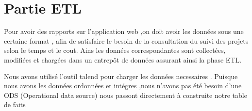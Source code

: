 \section{ Partie ETL }
Pour avoir des rapports sur l'application web ,on doit avoir les données sous une certaine format ,
afin de satisfaire le besoin de la consultation du suivi des projets selon le temps et le cout.
Ains les données correspondantes sont collectées, modifiées et chargées dans un entrepôt de données
assurant ainsi la phase ETL.

Nous avons utilisé l'outil talend pour charger les données necessaires .
Puisque nous avons les données ordonnées et intégres ,nous n'avons pas été besoin d'une ODS (Operational data source)
nous passont directement à construite notre table de faits




